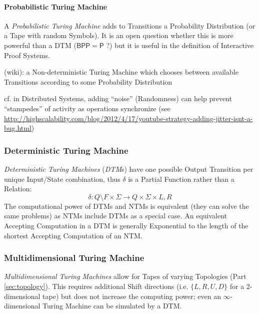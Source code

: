 \paragraph{Probabilistic Turing Machine}
\label{sec:probabilistic_turing_machine}\hfill

A \emph{Probabilistic Turing Machine} adds to Transitions a Probability
Distribution (or a Tape with random Symbols). It is an open question whether
this is more powerful than a DTM ($\mathsf{BPP}=\mathsf{P}$ ?) but it is useful
in the definition of Interactive Proof Systems. %

(wiki): a Non-deterministic Turing Machine which chooses between available
Transitions according to some Probability Distribution

cf. in Distributed Systems, adding ``noise'' (Randomness) can help prevent
``stampedes'' of activity as operations synchronize (see
\url{http://highscalability.com/blog/2012/4/17/youtube-strategy-adding-jitter-isnt-a-bug.html})



\subsubsection{Deterministic Turing Machine}
\label{sec:deterministic_turing_machine}

\emph{Deterministic Turing Machines} (\emph{DTM}s) have one possible
Output Transition per unique Input/State combination, thus $\delta$ is
a Partial Function rather than a Relation:
\[
  \delta : Q \setminus F \times \Sigma \rightarrow Q \times
  \Sigma \times {L,R}
\]
The computational power of DTMs and NTMs is equivalent (they can solve
the same problems) as NTMs include DTMs as a special case. An
equivalent Accepting Computation in a DTM is generally Exponential to
the length of the shortest Accepting Computation of an NTM.



\subsubsection{Multidimensional Turing Machine}
\label{sec:multidimensional_turing_machine}

\emph{Multidimensional Turing Machines} allow for Tapes of varying
Topologies (Part \ref{sec:topology}). This requires additional Shift
directions (i.e. $\{L, R, U, D\}$ for a 2-dimensional tape) but does
not increase the computing power; even an $\infty$-dimensional Turing
Machine can be simulated by a DTM.



